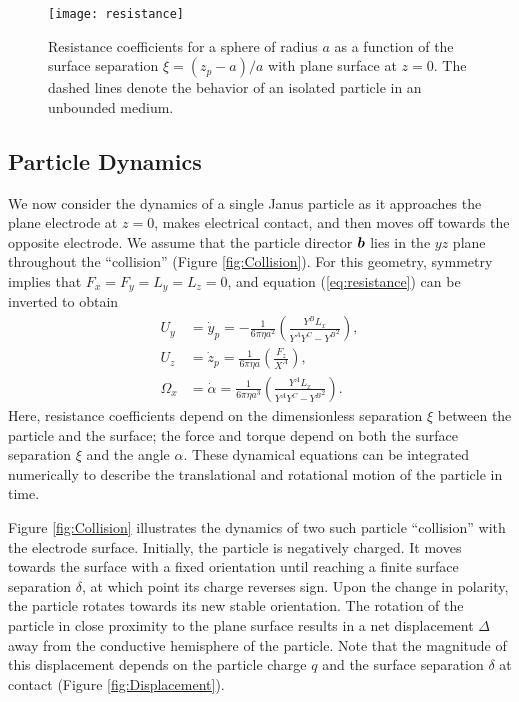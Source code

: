 \begin{appendices}
\begin{figure}[h]
    \centering
    \texttt{[image: resistance]}
    \caption{Resistance coefficients for a sphere of radius $a$ as a function of the surface separation $\xi=(z_p-a)/a$ with plane surface at $z=0$. The dashed lines denote the behavior of an isolated particle in an unbounded medium.}
    \label{fig:resistance}
\end{figure}

\subsection{Particle Dynamics}

We now consider the dynamics of a single Janus particle as it approaches the plane electrode at $z=0$, makes electrical contact, and then moves off towards the opposite electrode. We assume that the particle director $\boldsymbol{b}$ lies in the $yz$ plane throughout the ``collision'' (Figure \ref{fig:Collision}).  For this geometry, symmetry implies that $F_x=F_y=L_y=L_z=0$, and equation (\ref{eq:resistance}) can be inverted to obtain
\begin{align}
    U_y &= \dot{y}_p =- \frac{1}{6\pi\eta a^2} \left(\frac{Y^B L_x}{Y^A Y^C - {Y^B}^2}\right),
    \\
    U_z &= \dot{z}_p = \frac{1}{6\pi\eta a} \left( \frac{F_z}{X^A}\right),
    \\
    \Omega_x &= \dot{\alpha} = \frac{1}{6\pi\eta a^3} \left(\frac{Y^A L_x}{Y^A Y^C - {Y^B}^2} \right).
\end{align}
Here, resistance coefficients depend on the dimensionless separation $\xi$ between the particle and the surface; the force and torque depend on both the surface separation $\xi$ and the angle $\alpha$. These dynamical equations can be integrated numerically to describe the translational and rotational motion of the particle in time. 

Figure \ref{fig:Collision} illustrates the dynamics of two such particle ``collision'' with the electrode surface. Initially, the particle is negatively charged.  It moves towards the surface with a fixed orientation until reaching a finite surface separation $\delta$, at which point its charge reverses sign. Upon the change in polarity, the particle  rotates towards its new stable orientation.  The rotation of the particle in close proximity to the plane surface results in a net displacement $\Delta$ away from the conductive hemisphere of the particle.  Note that the magnitude of this displacement depends on the particle charge $q$ and the surface separation $\delta$ at contact (Figure \ref{fig:Displacement}).


\end{appendices}
